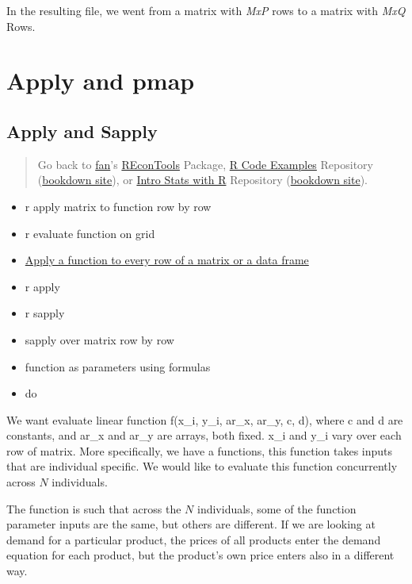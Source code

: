 \documentclass[
]{book}
\providecommand{\tightlist}{%
  \setlength{\itemsep}{0pt}\setlength{\parskip}{0pt}}
\begin{document}
In the resulting file, we went from a matrix with \emph{MxP} rows to a matrix with \emph{MxQ} Rows.

\hypertarget{apply-and-pmap}{%
\section{Apply and pmap}\label{apply-and-pmap}}

\hypertarget{apply-and-sapply}{%
\subsection{Apply and Sapply}\label{apply-and-sapply}}

\begin{quote}
Go back to \href{http://fanwangecon.github.io/}{fan}'s \href{https://fanwangecon.github.io/REconTools/}{REconTools} Package, \href{https://fanwangecon.github.io/R4Econ/}{R Code Examples} Repository (\href{https://fanwangecon.github.io/R4Econ/bookdown}{bookdown site}), or \href{https://fanwangecon.github.io/Stat4Econ/}{Intro Stats with R} Repository (\href{https://fanwangecon.github.io/Stat4Econ/bookdown}{bookdown site}).
\end{quote}

\begin{itemize}
\tightlist
\item
  r apply matrix to function row by row
\item
  r evaluate function on grid
\item
  \href{https://stackoverflow.com/questions/4236368/apply-a-function-to-every-row-of-a-matrix-or-a-data-frame}{Apply a function to every row of a matrix or a data frame}
\item
  r apply
\item
  r sapply
\item
  sapply over matrix row by row
\item
  function as parameters using formulas
\item
  do
\end{itemize}

We want evaluate linear function f(x\_i, y\_i, ar\_x, ar\_y, c, d), where c and d are constants, and ar\_x and ar\_y are arrays, both fixed. x\_i and y\_i vary over each row of matrix. More specifically, we have a functions, this function takes inputs that are individual specific. We would like to evaluate this function concurrently across \(N\) individuals.

The function is such that across the \(N\) individuals, some of the function parameter inputs are the same, but others are different. If we are looking at demand for a particular product, the prices of all products enter the demand equation for each product, but the product's own price enters also in a different way.
\end{document}
